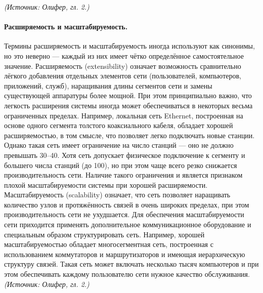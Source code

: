 \documentclass[a4paper,12pt]{article}
\begin{document}
\textit{(Источник: Олифер, гл. 2.)}

\paragraph{Расширяемость и масштабируемость.}
Термины расширяемость и масштабируемость иногда используют как синонимы, но это неверно — каждый из них имеет чётко определённое самостоятельное значение. Расширяемость (extensibility) означает возможность сравнительно лёгкого добавления отдельных элементов сети (пользователей, компьютеров, приложений, служб), наращивания длины сегментов сети и замены существующей аппаратуры более мощной. При этом принципиально важно, что легкость расширения системы иногда может обеспечиваться в некоторых весьма ограниченных пределах. Например, локальная сеть Ethernet, построенная на основе одного сегмента толстого коаксиального кабеля, обладает хорошей расширяемостью, в том смысле, что позволяет легко подключать новые станции. Однако такая сеть имеет ограничение на число станций — оно не должно превышать 30–40. Хотя сеть допускает физическое подключение к сегменту и большего числа станций (до 100), но при этом чаще всего резко снижается производительность сети. Наличие такого ограничения и является признаком плохой масштабируемости системы при хорошей расширяемости. Масштабируемость (scalability) означает, что сеть позволяет наращивать количество узлов и протяжённость связей в очень широких пределах, при этом производительность сети не ухудшается. Для обеспечения масштабируемости сети приходится применять дополнительное коммуникационное оборудование и специальным образом структурировать сеть. Например, хорошей масштабируемостью обладает многосегментная сеть, построенная с использованием коммутаторов и маршрутизаторов и имеющая иерархическую структуру связей. Такая сеть может включать несколько тысяч компьютеров и при этом обеспечивать каждому пользователю сети нужное качество обслуживания.
\textit{(Источник: Олифер, гл. 2.)}
\end{document}

